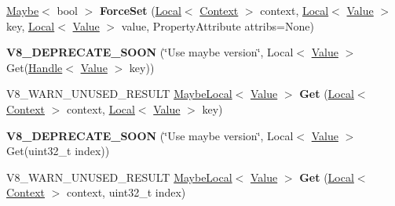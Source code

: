 \begin{DoxyCompactItemize}
\item 
\hypertarget{classv8_1_1_object_a46e406fbb5a5d81a024d4114777c5c0d}{}\hyperlink{classv8_1_1_maybe}{Maybe}$<$ bool $>$ {\bfseries Force\+Set} (\hyperlink{classv8_1_1_local}{Local}$<$ \hyperlink{classv8_1_1_context}{Context} $>$ context, \hyperlink{classv8_1_1_local}{Local}$<$ \hyperlink{classv8_1_1_value}{Value} $>$ key, \hyperlink{classv8_1_1_local}{Local}$<$ \hyperlink{classv8_1_1_value}{Value} $>$ value, Property\+Attribute attribs=None)\label{classv8_1_1_object_a46e406fbb5a5d81a024d4114777c5c0d}

\item 
\hypertarget{classv8_1_1_object_a8fc6e6d42055dfb32dc0c83c62c79078}{}{\bfseries V8\+\_\+\+D\+E\+P\+R\+E\+C\+A\+T\+E\+\_\+\+S\+O\+O\+N} (\char`\"{}Use maybe version\char`\"{}, Local$<$ \hyperlink{classv8_1_1_value}{Value} $>$ Get(\hyperlink{classv8_1_1_local}{Handle}$<$ \hyperlink{classv8_1_1_value}{Value} $>$ key))\label{classv8_1_1_object_a8fc6e6d42055dfb32dc0c83c62c79078}

\item 
\hypertarget{classv8_1_1_object_a239c03bb250cd6bf583ca60f72e18918}{}V8\+\_\+\+W\+A\+R\+N\+\_\+\+U\+N\+U\+S\+E\+D\+\_\+\+R\+E\+S\+U\+L\+T \hyperlink{classv8_1_1_maybe_local}{Maybe\+Local}$<$ \hyperlink{classv8_1_1_value}{Value} $>$ {\bfseries Get} (\hyperlink{classv8_1_1_local}{Local}$<$ \hyperlink{classv8_1_1_context}{Context} $>$ context, \hyperlink{classv8_1_1_local}{Local}$<$ \hyperlink{classv8_1_1_value}{Value} $>$ key)\label{classv8_1_1_object_a239c03bb250cd6bf583ca60f72e18918}

\item 
\hypertarget{classv8_1_1_object_ac27f1b680e53d4c9c879aac3c7380202}{}{\bfseries V8\+\_\+\+D\+E\+P\+R\+E\+C\+A\+T\+E\+\_\+\+S\+O\+O\+N} (\char`\"{}Use maybe version\char`\"{}, Local$<$ \hyperlink{classv8_1_1_value}{Value} $>$ Get(uint32\+\_\+t index))\label{classv8_1_1_object_ac27f1b680e53d4c9c879aac3c7380202}

\item 
\hypertarget{classv8_1_1_object_ac1fcfcfedaf66775c46b53cb1804b949}{}V8\+\_\+\+W\+A\+R\+N\+\_\+\+U\+N\+U\+S\+E\+D\+\_\+\+R\+E\+S\+U\+L\+T \hyperlink{classv8_1_1_maybe_local}{Maybe\+Local}$<$ \hyperlink{classv8_1_1_value}{Value} $>$ {\bfseries Get} (\hyperlink{classv8_1_1_local}{Local}$<$ \hyperlink{classv8_1_1_context}{Context} $>$ context, uint32\+\_\+t index)\label{classv8_1_1_object_ac1fcfcfedaf66775c46b53cb1804b949}


\end{DoxyCompactItemize}
